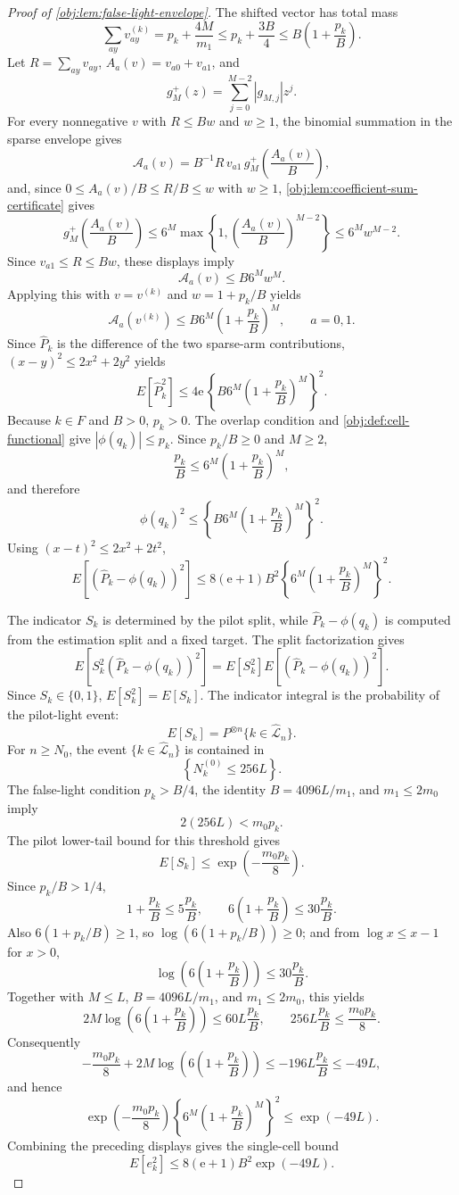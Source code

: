 \begin{proof}[Proof of \cref{obj:lem:false-light-envelope}]
The shifted vector has total mass
\[
\sum_{ay}v^{(k)}_{ay}
=p_k+\frac{4M}{m_1}
\le p_k+\frac{3B}{4}
\le B\left(1+\frac{p_k}{B}\right).
\]
Let \(R=\sum_{ay}v_{ay}\), \(A_a(v)=v_{a0}+v_{a1}\), and
\[
g_M^+(z)=\sum_{j=0}^{M-2}|g_{M,j}|z^j.
\]
For every nonnegative \(v\) with \(R\le Bw\) and \(w\ge1\), the binomial summation in the sparse envelope gives
\[
\mathcal A_a(v)
=
B^{-1}R\,v_{a1}\,g_M^+\!\left(\frac{A_a(v)}B\right),
\]
and, since \(0\le A_a(v)/B\le R/B\le w\) with \(w\ge1\), \cref{obj:lem:coefficient-sum-certificate} gives
\[
g_M^+\!\left(\frac{A_a(v)}B\right)
\le 6^M\max\left\{1,\left(\frac{A_a(v)}B\right)^{M-2}\right\}
\le 6^M w^{M-2}.
\]
Since \(v_{a1}\le R\le Bw\), these displays imply
\[
\mathcal A_a(v)
\le B6^M w^M.
\]
Applying this with \(v=v^{(k)}\) and \(w=1+p_k/B\) yields
\[
\mathcal A_a(v^{(k)})
\le
B6^M\left(1+\frac{p_k}{B}\right)^M,
\qquad a=0,1.
\]
Since \(\widehat P_k\) is the difference of the two sparse-arm contributions, \((x-y)^2\le2x^2+2y^2\) yields
\[
E[\widehat P_k^2]
\le
4\mathrm e\,
\left\{
B6^M\left(1+\frac{p_k}{B}\right)^M
\right\}^2 .
\]
Because \(k\in F\) and \(B>0\), \(p_k>0\).  The overlap condition and \cref{obj:def:cell-functional} give \(|\phi(q_k)|\le p_k\).  Since \(p_k/B\ge0\) and \(M\ge2\),
\[
\frac{p_k}{B}
\le
6^M\left(1+\frac{p_k}{B}\right)^M,
\]
and therefore
\[
\phi(q_k)^2
\le
\left\{
B6^M\left(1+\frac{p_k}{B}\right)^M
\right\}^2 .
\]
Using \((x-t)^2\le2x^2+2t^2\),
\[
E\!\left[(\widehat P_k-\phi(q_k))^2\right]
\le
8(\mathrm e+1)B^2
\left\{6^M\left(1+\frac{p_k}{B}\right)^M\right\}^2 .
\]

The indicator \(S_k\) is determined by the pilot split, while \(\widehat P_k-\phi(q_k)\) is computed from the estimation split and a fixed target.  The split factorization gives
\[
E\!\left[S_k^2(\widehat P_k-\phi(q_k))^2\right]
=
E[S_k^2]E\!\left[(\widehat P_k-\phi(q_k))^2\right].
\]
Since \(S_k\in\{0,1\}\), \(E[S_k^2]=E[S_k]\).  The indicator integral is the probability of the pilot-light event:
\[
E[S_k]
= P^{\otimes n}\{k\in\widehat{\mathcal L}_n\}.
\]
For \(n\ge N_0\), the event \(\{k\in\widehat{\mathcal L}_n\}\) is contained in
\[
\left\{N_k^{(0)}\le 256L\right\}.
\]
The false-light condition \(p_k>B/4\), the identity \(B=4096L/m_1\), and \(m_1\le2m_0\) imply
\[
2(256L)<m_0p_k.
\]
The pilot lower-tail bound for this threshold gives
\[
E[S_k]
\le
\exp\!\left(-\frac{m_0p_k}{8}\right).
\]
Since \(p_k/B>1/4\),
\[
1+\frac{p_k}{B}\le 5\frac{p_k}{B},
\qquad
6\left(1+\frac{p_k}{B}\right)\le30\frac{p_k}{B}.
\]
Also \(6(1+p_k/B)\ge1\), so \(\log(6(1+p_k/B))\ge0\); and from \(\log x\le x-1\) for \(x>0\),
\[
\log\!\left(6\left(1+\frac{p_k}{B}\right)\right)
\le 30\frac{p_k}{B} .
\]
Together with \(M\le L\), \(B=4096L/m_1\), and \(m_1\le2m_0\), this yields
\[
2M\log\!\left(6\left(1+\frac{p_k}{B}\right)\right)
\le60L\frac{p_k}{B},
\qquad
256L\frac{p_k}{B}\le \frac{m_0p_k}{8}.
\]
Consequently
\[
-\frac{m_0p_k}{8}
+2M\log\!\left(6\left(1+\frac{p_k}{B}\right)\right)
\le -196L\frac{p_k}{B}\le -49L,
\]
and hence
\[
\exp\!\left(-\frac{m_0p_k}{8}\right)
\left\{6^M\left(1+\frac{p_k}{B}\right)^M\right\}^2
\le
\exp(-49L).
\]
Combining the preceding displays gives the single-cell bound
\[
E[e_k^2]
\le
8(\mathrm e+1)B^2\exp(-49L).
\]


\end{proof}
